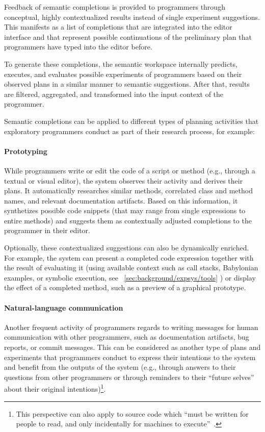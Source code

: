 Feedback of semantic completions is provided to programmers through conceptual, highly contextualized results instead of single experiment suggestions.
This manifests as a list of completions that are integrated into the editor interface and that represent possible continuations of the preliminary plan that programmers have typed into the editor before.

To generate these completions, the semantic workspace internally predicts, executes, and evaluates possible experiments of programmers based on their observed plans in a similar manner to semantic suggestions.
After that, results are filtered, aggregated, and transformed into the input context of the programmer.

Semantic completions can be applied to different types of planning activities that exploratory programmers conduct as part of their research process, for example:

\paragraph{Prototyping}
While programmers write or edit the code of a script or method (e.g., through a textual or visual editor), the system observes their activity and derives their plans.
It automatically researches similar methods, correlated class and method names, and relevant documentation artifacts.
Based on this information, it synthetizes possible code snippets (that may range from single expressions to entire methods) and suggests them as contextually adjusted completions to the programmer in their editor.

Optionally, these contextualized suggestions can also be dynamically enriched.
For example, the system can present a completed code expression together with the result of evaluating it (using available context such as call stacks, Babylonian examples, or symbolic execution, see~%
\cref{sec:background/expsys/tools}%
) or display the effect of a completed method, such as a preview of a graphical prototype.


\paragraph{Natural-language communication}
Another frequent activity of programmers regards to writing messages for human communication with other programmers, such as documentation artifacts, bug reports, or commit messages.
This can be considered as another type of plans and experiments that programmers conduct to express their intentions to the system and benefit from the outputs of the system (e.g., through answers to their questions from other programmers or through reminders to their ``future selves'' about their original intentions)\footnote{This perspective can also apply to source code which ``must be written for people to read,
and only incidentally for machines to execute''~\cite[p.~xxii]{abelson1996structure}.}.

